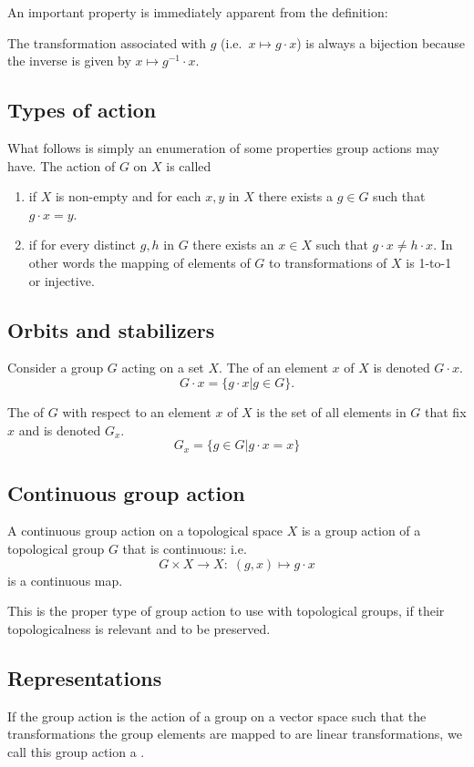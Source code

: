 An important property is immediately apparent from the definition:
\begin{eigenschap}
The transformation associated with $g$ (i.e.\ $x\mapsto g\cdot x$) is always a bijection because the inverse is given by $x \mapsto g^{-1}\cdot x$.
\end{eigenschap}

\subsection{Types of action}
What follows is simply an enumeration of some properties group actions may have. The action of $G$ on $X$ is called
\begin{enumerate}
\item {} if $X$ is non-empty and for each $x,y$ in $X$ there exists a $g \in G$ such that $g\cdot x = y$.
\item {} if for every distinct $g,h$ in $G$ there exists an $x \in X$ such that $g\cdot x \neq h\cdot x$. In other words the mapping of elements of $G$ to transformations of $X$ is 1-to-1 or injective.
\end{enumerate}

\subsection{Orbits and stabilizers}
\begin{definition}
Consider a group $G$ acting on a set $X$. The  of an element $x$ of $X$ is denoted $G\cdot x$.
\[ G\cdot x = \{ g\cdot x | g\in G \}. \]
\end{definition}

The  of $G$ with respect to an element $x$ of $X$ is the set of all elements in $G$ that fix $x$ and is denoted $G_x$.
\[G_x = \{ g\in G | g\cdot x = x \} \]

\subsection{Continuous group action}
A continuous group action on a topological space $X$ is a group action of a topological group $G$ that is continuous: i.e.\,
\[G \times X \to X : \;(g, x) \mapsto g \cdot x \]
is a continuous map.

This is the proper type of group action to use with topological groups, if their topologicalness is relevant and to be preserved.

\subsection{Representations}
If the group action is the action of a group on a vector space such that the transformations the group elements are mapped to are linear transformations, we call this group action a .

